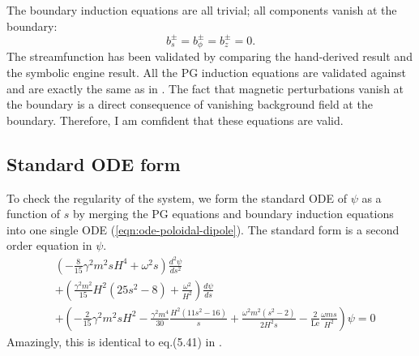The boundary induction equations are all trivial; all components vanish at the boundary:
\begin{equation}\label{eqn:eigen-bound-toroidal-quadrupole}
    b^{\pm}_{s} = b^{\pm}_{\phi} = b^{\pm}_{z} = 0.
\end{equation}
The streamfunction has been validated by comparing the hand-derived result and the symbolic engine result. All the PG induction equations are validated against and are exactly the same as in \textcite{holdenried-chernoff_long_2021}. The fact that magnetic perturbations vanish at the boundary is a direct consequence of vanishing background field at the boundary. Therefore, I am comfident that these equations are valid.


\subsection{Standard ODE form}

To check the regularity of the system, we form the standard ODE of $\psi$ as a function of $s$ by merging the PG equations and boundary induction equations into one single ODE (\ref{eqn:ode-poloidal-dipole}).
The standard form is a second order equation in $\psi$.
\begin{equation}\label{eqn:ode-toroidal-quadrupole}
\begin{aligned}
    &\left(- \frac{8}{15}\gamma^{2} m^{2} s H^4 + \omega^{2} s\right) \frac{d^{2}\psi}{d s^{2}} \\
    &+ \left(\frac{\gamma^{2} m^{2}}{15} H^2 \left(25 s^{2} - 8\right) + \frac{\omega^{2}}{H^{2}}\right) \frac{d\psi}{d s} \\
    &+ \left(- \frac{2}{15} \gamma^{2} m^{2} s H^2 - \frac{\gamma^{2} m^{4}}{30} \frac{H^2 \left(11 s^{2} - 16\right)}{s} + \frac{\omega^{2} m^{2} \left(s^2 - 2\right)}{2 H^{2} s} - \frac{2}{\mathrm{Le}} \frac{\omega m s}{H^{2}}\right) \psi = 0
\end{aligned}
\end{equation}
Amazingly, this is identical to eq.(5.41) in \textcite{holdenried-chernoff_long_2021}.

